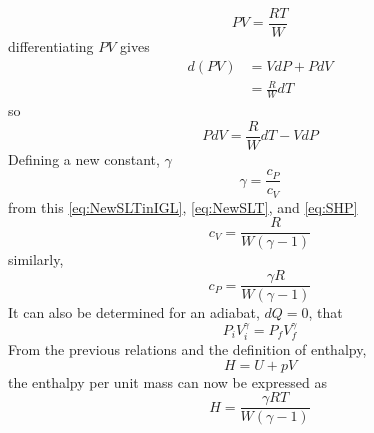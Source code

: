 \begin{equation}\label{IGL1}
PV=\frac{RT}{W}
\end{equation}
differentiating $PV$ gives
\begin{align}
d(PV)&=VdP+PdV\\
&=\frac{R}{W}dT
\end{align}
so
\begin{equation}
PdV=\frac{R}{W}dT-VdP
\end{equation}
Defining a new constant, $\gamma$
\begin{equation}\label{eq:Gamma}
\gamma=\frac{c_P}{c_V}
\end{equation}%
from this \ref{eq:NewSLTinIGL}, \ref{eq:NewSLT}, and \ref{eq:SHP}
\begin{equation}\label{eq:GammaincV}
c_V=\frac{R}{W(\gamma-1)}
\end{equation}
similarly,
\begin{equation}\label{eq:GammaincP}
c_P=\frac{\gamma R}{W(\gamma-1)}
\end{equation}
It can also be determined for an adiabat, $dQ=0$, that
\begin{equation}\label{eq:adiabat}
P_iV_i^{\gamma}=P_fV_f^{\gamma}
\end{equation}
From the previous relations and the definition of enthalpy,
\begin{equation}\label{eq:Enthalpy}
H=U+pV
\end{equation}%
the enthalpy per unit mass can now be expressed as
\begin{equation}\label{eq:Enthalpypermass}
H=\frac{\gamma RT}{W(\gamma-1)}
\end{equation}
